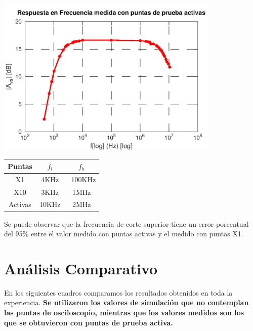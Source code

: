 \documentclass[a4paper, 10pt, spanish]{article}
\begin{document}
\begin{center}
  \includegraphics[width=0.8\textwidth]{activas.png}
  \label{fig:activas_med}
\end{center}

\begin{center}
  \begin{tabular}{|c|c|c|}
    \hline
    Puntas & $f_l$ & $f_h$ \\
    \hline
    X1 & 4KHz & ~100KHz \\
    \hline
    X10 & 3KHz & 1MHz\\
    \hline
    Activas & 10KHz& 2MHz\\
    \hline
  \end{tabular}
  \label{tab:rta_frec_med}
\end{center}
Se puede observar que la frecuencia de corte superior tiene un error porcentual del 95\% entre el valor medido con puntas activas y el medido con puntas X1.

\section{Análisis Comparativo}
En los siguientes cuadros comparamos los resultados obtenidos en toda la experiencia. \textbf{Se utilizaron los valores de simulación que no contemplan las puntas de osciloscopio, mientras que los valores medidos son los que se obtuvieron con puntas de prueba activa.}
\end{document}
